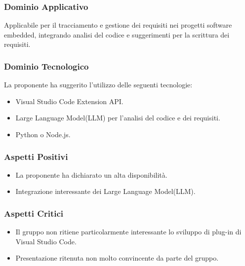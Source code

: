 \documentclass[a4paper, 12pt]{article}
\begin{document}
\subsubsection{Dominio Applicativo}
Applicabile per il tracciamento e gestione dei requisiti nei progetti software embedded, integrando analisi del codice e suggerimenti per la scrittura dei requisiti.

\subsubsection{Dominio Tecnologico}
La proponente ha suggerito l’utilizzo delle seguenti tecnologie:
\begin{itemize}
    \item Visual Studio Code Extension API.
    \item Large Language Model(LLM) per l'analisi del codice e dei requisiti.
    \item Python o Node.js.
\end{itemize}

\subsubsection{Aspetti Positivi}
\begin{itemize}
    \item La proponente ha dichiarato un alta disponibilità.
    \item Integrazione interessante dei Large Language Model(LLM).
\end{itemize}

\subsubsection{Aspetti Critici}
\begin{itemize}
    \item Il gruppo non ritiene particolarmente interessante lo sviluppo di plug-in di Visual Studio Code.
    \item Presentazione ritenuta non molto convincente da parte del gruppo.
\end{itemize}
\end{document}
